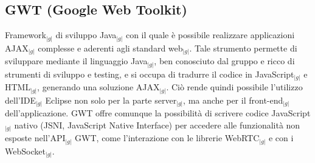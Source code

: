 {	\subsection{GWT (Google Web Toolkit)}{
		Framework$_{|g|}$ di sviluppo Java$_{|g|}$ con il quale è possibile realizzare applicazioni AJAX$_{|g|}$
		complesse e aderenti agli standard web$_{|g|}$. Tale strumento permette di sviluppare mediante il linguaggio
		Java$_{|g|}$, ben conosciuto dal gruppo e ricco di strumenti di sviluppo e testing, e si occupa di tradurre 
		il codice in JavaScript$_{|g|}$ e HTML$_{|g|}$, generando una soluzione AJAX$_{|g|}$. Ciò rende quindi possibile 
		l'utilizzo dell'IDE$_{|g|}$ Eclipse non solo per la parte server$_{|g|}$, ma anche per il front-end$_{|g|}$
		dell'applicazione. GWT offre comunque la possibilità di scrivere codice JavaScript$_{|g|}$ nativo (JSNI,
		JavaScript Native Interface) per accedere alle funzionalità non esposte nell'API$_{|g|}$ GWT, come 
		l'interazione con le librerie WebRTC$_{|g|}$ e con i WebSocket$_{|g|}$.
	}
}
